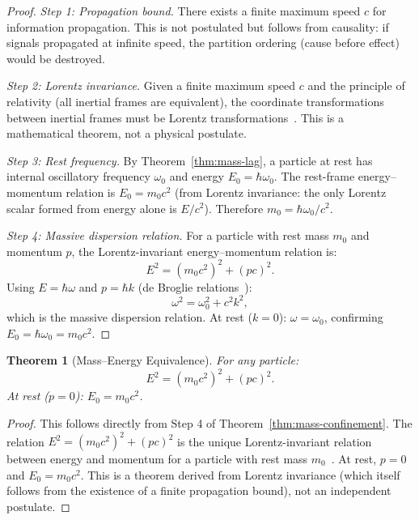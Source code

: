 \documentclass[11pt,twocolumn,a4paper]{article}
\newtheorem{theorem}{Theorem}[section]
\theoremstyle{definition}
\theoremstyle{remark}
\begin{document}
\begin{proof}
\emph{Step 1: Propagation bound.} There exists a finite maximum speed $c$ for information propagation. This is not postulated but follows from causality: if signals propagated at infinite speed, the partition ordering (cause before effect) would be destroyed.

\emph{Step 2: Lorentz invariance.} Given a finite maximum speed $c$ and the principle of relativity (all inertial frames are equivalent), the coordinate transformations between inertial frames must be Lorentz transformations~\citep{ignatowsky1910}. This is a mathematical theorem, not a physical postulate.

\emph{Step 3: Rest frequency.} By Theorem~\ref{thm:mass-lag}, a particle at rest has internal oscillatory frequency $\omega_0$ and energy $E_0 = \hbar\omega_0$. The rest-frame energy--momentum relation is $E_0 = m_0 c^2$ (from Lorentz invariance: the only Lorentz scalar formed from energy alone is $E/c^2$). Therefore $m_0 = \hbar\omega_0/c^2$.

\emph{Step 4: Massive dispersion relation.} For a particle with rest mass $m_0$ and momentum $p$, the Lorentz-invariant energy--momentum relation is:
\[
  E^2 = (m_0 c^2)^2 + (pc)^2.
\]
Using $E = \hbar\omega$ and $p = \hbar k$ (de Broglie relations~\citep{debroglie1924}):
\[
  \omega^2 = \omega_0^2 + c^2 k^2,
\]
which is the massive dispersion relation. At rest ($k=0$): $\omega = \omega_0$, confirming $E_0 = \hbar\omega_0 = m_0 c^2$.
\end{proof}

\begin{theorem}[Mass--Energy Equivalence]
\label{thm:mass-energy}
For any particle:
\begin{equation}
\label{eq:mass-energy}
  E^2 = (m_0 c^2)^2 + (pc)^2.
\end{equation}
At rest ($p=0$): $E_0 = m_0 c^2$.
\end{theorem}

\begin{proof}
This follows directly from Step 4 of Theorem~\ref{thm:mass-confinement}. The relation $E^2 = (m_0 c^2)^2 + (pc)^2$ is the unique Lorentz-invariant relation between energy and momentum for a particle with rest mass $m_0$~\citep{einstein1905a}. At rest, $p = 0$ and $E_0 = m_0 c^2$. This is a theorem derived from Lorentz invariance (which itself follows from the existence of a finite propagation bound), not an independent postulate.
\end{proof}
\end{document}

